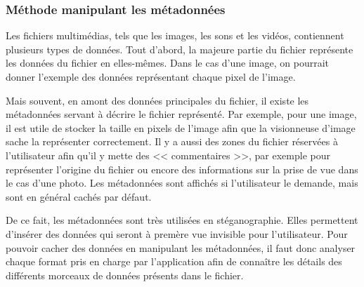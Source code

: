 \documentclass[11pt]{article}
\begin{document}
\subsubsection{Méthode manipulant les métadonnées}

Les fichiers multimédias, tels que les images, les sons et les vidéos,
contiennent plusieurs types de données. Tout d'abord, la majeure partie du
fichier représente les données du fichier en elles-mêmes. Dans le cas d'une
image, on pourrait donner l'exemple des données représentant chaque pixel de
l'image. 

Mais souvent, en amont des données principales du fichier, il existe les
métadonnées servant à décrire le fichier représenté. Par exemple, pour une
image, il est utile de stocker la taille en pixels de l'image afin que la
visionneuse d'image sache la représenter correctement. Il y a aussi des zones du
fichier réservées à l'utilisateur afin qu'il y mette des << commentaires >>, par
exemple pour représenter l'origine du fichier ou encore des informations sur la
prise de vue dans le cas d'une photo. Les métadonnées sont affichés si
l'utilisateur le demande, mais sont en général cachés par défaut.

De ce fait, les métadonnées sont très utilisées en stéganographie. Elles
permettent d'insérer des données qui seront à premère vue invisible pour
l'utilisateur. Pour pouvoir cacher des données en manipulant les métadonnées,
il faut donc analyser chaque format pris en charge par l'application afin de
connaître les détails des différents morceaux de données présents dans le
fichier. 
\end{document}
